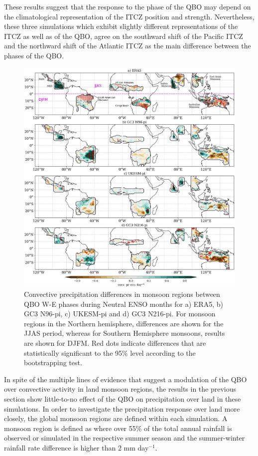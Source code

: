 These results suggest that the response to the phase of the QBO may depend on the climatological representation of the ITCZ position and strength. Nevertheless, these three simulations which exhibit slightly different representations of the ITCZ as well as of the QBO, agree on the southward shift of the Pacific ITCZ and the northward shift of the Atlantic ITCZ as the main difference between the phases of the QBO. 

\begin{figure}[t!]
\centering
 \includegraphics[width=\linewidth]{figures/monsoon_cmip_qbownn.png}
\caption[Global monsoon impacts of the QBO.]{ Convective precipitation differences in monsoon regions between QBO W-E  phases during Neutral ENSO months for a) ERA5, b) GC3 N96-pi, c) UKESM-pi and d) GC3 N216-pi. For monsoon regions in the Northern hemisphere, differences are shown for the JJAS period, whereas for Southern Hemisphere monsoons, results are shown for DJFM.  Red dots indicate differences that are statistically significant to the 95\% level according to the bootstrapping test.}
\label{fig:mons_map}
\end{figure}

In spite of the multiple lines of evidence that suggest a modulation of the QBO over convective activity in land monsoon regions, the results in the previous section show little-to-no effect of the QBO on precipitation over land in these simulations. 
In order to investigate the precipitation response over land more closely, the global monsoon regions are defined within each simulation.  A monsoon region is defined as where over 55\% of the total annual rainfall is observed or simulated in the respective summer season and the summer-winter rainfall rate difference is higher than  2 mm day$^{-1}$\citep{wang2008,wang2017,wang2021monsoons}. 

